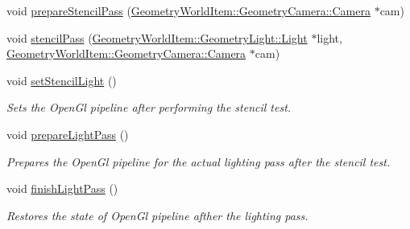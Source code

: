 \begin{DoxyCompactItemize}
void \mbox{\hyperlink{class_geometry_engine_1_1_geometry_render_step_1_1_lighting_pass_a1a3280c28b0750c7cad03f01d37374c7}{prepare\+Stencil\+Pass}} (\mbox{\hyperlink{class_geometry_engine_1_1_geometry_world_item_1_1_geometry_camera_1_1_camera}{Geometry\+World\+Item\+::\+Geometry\+Camera\+::\+Camera}} $\ast$cam)
\item 
void \mbox{\hyperlink{class_geometry_engine_1_1_geometry_render_step_1_1_lighting_pass_a42b7f335d4bebdbdd06c3bef142844c0}{stencil\+Pass}} (\mbox{\hyperlink{class_geometry_engine_1_1_geometry_world_item_1_1_geometry_light_1_1_light}{Geometry\+World\+Item\+::\+Geometry\+Light\+::\+Light}} $\ast$light, \mbox{\hyperlink{class_geometry_engine_1_1_geometry_world_item_1_1_geometry_camera_1_1_camera}{Geometry\+World\+Item\+::\+Geometry\+Camera\+::\+Camera}} $\ast$cam)
\item 
\mbox{\label{class_geometry_engine_1_1_geometry_render_step_1_1_lighting_pass_a576001cdaa8f2a377b926d9bcd7b2444}} 
void \mbox{\hyperlink{class_geometry_engine_1_1_geometry_render_step_1_1_lighting_pass_a576001cdaa8f2a377b926d9bcd7b2444}{set\+Stencil\+Light}} ()
\begin{DoxyCompactList}\small\item\em Sets the Open\+Gl pipeline after performing the stencil test. \end{DoxyCompactList}\item 
\mbox{\label{class_geometry_engine_1_1_geometry_render_step_1_1_lighting_pass_aab66c6267b48f6ddb6c867303bd5dab1}} 
void \mbox{\hyperlink{class_geometry_engine_1_1_geometry_render_step_1_1_lighting_pass_aab66c6267b48f6ddb6c867303bd5dab1}{prepare\+Light\+Pass}} ()
\begin{DoxyCompactList}\small\item\em Prepares the Open\+Gl pipeline for the actual lighting pass after the stencil test. \end{DoxyCompactList}\item 
\mbox{\label{class_geometry_engine_1_1_geometry_render_step_1_1_lighting_pass_a6d5e908865443b942b83362bf2d8a081}} 
void \mbox{\hyperlink{class_geometry_engine_1_1_geometry_render_step_1_1_lighting_pass_a6d5e908865443b942b83362bf2d8a081}{finish\+Light\+Pass}} ()
\begin{DoxyCompactList}\small\item\em Restores the state of Open\+Gl pipeline afther the lighting pass. \end{DoxyCompactList}\item 

\end{DoxyCompactItemize}
